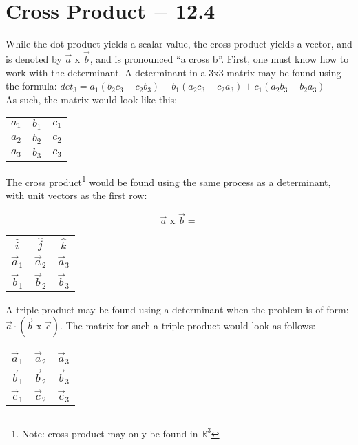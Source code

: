 \documentclass[12pt]{article}
\begin{document}
\section{Cross Product $-$ 12.4}

\begin{flushleft}

  While the dot product yields a scalar value, the cross product yields a vector, and is denoted by $\vec{a}\text{ x }\vec{b}$, and is pronounced ``a cross b''. First, one must know how to work with the determinant. A determinant in a 3x3 matrix may be found using the formula: $det_3=a_1(b_2c_3-c_2b_3)-b_1(a_2c_3-c_2a_3)+c_1(a_2b_3-b_2a_3)$\\

  As such, the matrix would look like this:

\end{flushleft}

\begin{center}
\begin{tabular}{| c c c |}

$a_1$ & $b_1$ & $c_1$ \\
$a_2$ & $b_2$ & $c_2$ \\
$a_3$ & $b_3$ & $c_3$ \\

\end{tabular}  
\end{center}

\begin{flushleft}

  The cross product\footnote{Note: cross product may only be found in $\mathbb{R}^3$} would be found using the same process as a determinant, with unit vectors as the first row:

\end{flushleft}

\begin{center}
  $$\vec{a}\text{ x }\vec{b}=$$
\begin{tabular}{| c c c |}

  $\hat{i}$ & $\hat{j}$ & $\hat{k}$ \\
  $\vec{a}_1$ & $\vec{a}_2$ & $\vec{a}_3$ \\
  $\vec{b}_1$ & $\vec{b}_2$ & $\vec{b}_3$ \\

\end{tabular}  
\end{center}

\begin{flushleft}

  A triple product may be found using a determinant when the problem is of form: $\vec{a}\cdot(\vec{b}\text{ x }\vec{c})$. The matrix for such a triple product would look as follows:

\end{flushleft}  

\begin{center}
\begin{tabular}{| c c c |}

  $\vec{a}_1$ & $\vec{a}_2$ & $\vec{a}_3$ \\
  $\vec{b}_1$ & $\vec{b}_2$ & $\vec{b}_3$ \\
  $\vec{c}_1$ & $\vec{c}_2$ & $\vec{c}_3$ \\

\end{tabular}  
\end{center}
\end{document}

